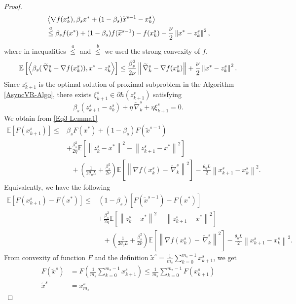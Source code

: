 \documentclass{article}
\newcommand*{\E}{\mathbb{E}}
\newcommand*{\VRG}{\,\widetilde{\nabla}_k^s}
\newcommand{\norm}[1]{\left\lVert#1\right\rVert}
\newcommand{\Iprod}[2]{\left\langle #1,#2\right\rangle}
\theoremstyle{definition}
\theoremstyle{remark}
\begin{document}
\begin{proof}
\begin{equation}\label{Eq4-Lemma1}
\begin{split}
&\Iprod{\nabla f(x_{k}^s)}{\beta_sx^*+(1-\beta_s)\widetilde{x}^{s-1}-{x}^{s}_{k}}\\
&\stackrel{a}{\leq} \beta_sf(x^*)+(1-\beta_s)f(\widetilde{x}^{s-1})-f(x_{k}^s)-\frac{\nu}{2}\norm{x^*-z_k^s}^2,
\end{split}
\raisetag{15pt}
\end{equation}
where in inequalities $\stackrel{a}{\leq}$ and $\stackrel{b}{\leq}$ we used the strong convexity of $f$. 
\begin{equation}\label{Eq4-Lemma1}
\begin{split}
\E\left[\Iprod{\beta_s(\VRG-\nabla f(x_{k}^s))}{x^* - z_{k}^s}\right] \leq \frac{\beta_s^2}{2\nu} \norm{\VRG-\nabla f(x_{k}^s)}+\frac{\nu}{2}\norm{x^* - z_{k}^s}^2.
\end{split}
\raisetag{15pt}
\end{equation}
Since $z_{k+1}^s$ is the optimal solution of proximal subproblem in the Algorithm \ref{AsyncVR-Algo}, there exists ${\xi}_{k+1}^s\in\partial h(z_{k+1}^s)$ satisfying
\begin{equation}\label{prox}
{\beta_s}(z_{k+1}^s - z_{k}^s) + \eta\VRG + \eta{\xi}_{k+1}^s = 0.
\end{equation}
We obtain from \eqref{Eq3-Lemma1}
\begin{equation}
\begin{split}
\E[F(x_{k+1}^s)] \leq &\beta_s F(x^*)+(1-\beta_s)F(\widetilde{x}^{s-1})\\
&+ {\frac{\beta_s^2}{2\eta}}\E[\norm{z_{k}^s-x^*}^2-\norm{z_{k+1}^s-x^*}^2]\\
&~~~+(\frac{1}{2\theta_{\eta} L}+\frac{\beta_s^2}{2\nu})\E\left[\norm{\nabla f(x_{k}^s)-\VRG}^2\right]-\frac{\theta_{\eta} L}{2}\norm{x_{k+1}^s-x_{k}^s}^2. 
\end{split}
\end{equation}
Equivalently, we have the following
\begin{equation}\label{main-ine-Lemma1}
\begin{split}
\E[F(x_{k+1}^s)-F(x^*)] \leq &(1-\beta_s)[F(\widetilde{x}^{s-1})-F(x^*)] \\
&+ {\frac{ \beta_s^2}{2\eta}}\E[\norm{z_{k}^s-x^*}^2-\norm{z_{k+1}^s-x^*}^2]\\
&~~~+(\frac{1}{2\theta_{\eta} L}+\frac{\beta_s^2}{2\nu})\E\left[\norm{\nabla f(x_{k}^s)-\VRG}^2\right]-\frac{\theta_{\eta} L}{2}\norm{x_{k+1}^s-x_{k}^s}^2. 
\end{split}
\end{equation}
From convexity of function $F$ and the definition $\widetilde{x}^s = \frac{1}{m_s}\sum_{k=0}^{m_s-1}x_{k+1}^s$, we get 
\begin{equation}
\begin{split}
F(\widetilde{x}^s) &= F(\frac{1}{m_s}\sum_{k=0}^{m_s-1} x_{k+1}^s)\leq \frac{1}{m_s}\sum_{k=0}^{m_s-1}F(x_{k+1}^s)\\
\widetilde{x}^s &= x_{m_s}^s
\end{split}
\end{equation}


\end{proof}
\end{document}
